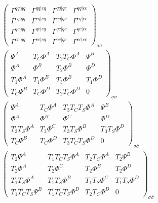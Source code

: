 \documentclass[10pt]{scrartcl}
\newcommand{\sss}{_{\sigma \sigma}}
\newcommand{\ssb}{_{\sigma \bar{\sigma}}}
\begin{document}
\begin{align}
\left( 
\begin{matrix}
\Gamma^{qq|qq} & \Gamma^{qq|cq} & \Gamma^{qq|qc} & \Gamma^{qq|cc} \\
\Gamma^{cq|qq} & \Gamma^{cq|cq} & \Gamma^{cq|qc} & \Gamma^{cq|cc} \\
\Gamma^{qc|qq} & \Gamma^{qc|cq} & \Gamma^{qc|qc} & \Gamma^{qc|cc} \\
\Gamma^{cc|qq} & \Gamma^{cc|cq} & \Gamma^{cc|qc} & \Gamma^{cc|cc} 
\end{matrix}
\right) \ssb
\nonumber \\
\left( 
\begin{matrix}
\Psi^A & T_C \Phi^A & T_2 T_C \Phi^A & \Psi^B \\
\Phi^A & \Phi^B & T_2 \Phi^B & \Phi^D \\
T_1 \Phi^A & T_1 \Phi^B & T_3 \Phi^B & T_1 \Phi^D \\
T_C \Psi^B & T_C \Phi^D & T_2 T_C \Phi^D & 0
\end{matrix}
\right) \sss
\nonumber \\
\left( 
\begin{matrix}
\Psi^A & T_C \Phi^A & T_3 T_C T_S \Phi^A & \Psi^B \\
\Phi^A & \Phi^B & \Phi^C & \Phi^D \\
T_3 T_S \Phi^A & T_3 \Phi^C & T_3 T_S \Phi^B & T_3 T_S \Phi^D \\
T_C \Psi^B & T_C \Phi^D & T_3 T_C T_S \Phi^D & 0
\end{matrix}
\right) \ssb
\nonumber \\
\left( 
\begin{matrix}
T_2 \Psi^A & T_1 T_C T_S \Phi^A & T_2 T_C \Phi^A & T_2 \Psi^B \\
T_2 \Phi^A & T_2 \Phi^C & T_2 \Phi^B & T_2 \Phi^D \\
T_1 T_S \Phi^A & T_1 T_S \Phi^B & T_1 T_S \Phi^C & T_1 T_S \Phi^D \\
T_1 T_C T_S \Psi^B & T_1 T_C T_S \Phi^D & T_2 T_C \Phi^D & 0
\end{matrix}
\right) \ssb
\end{align}

\newpage
\end{document}
